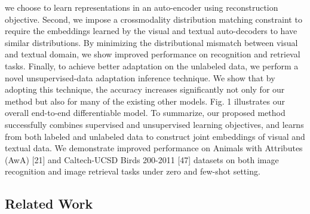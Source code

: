 \documentclass[10pt,twocolumn,letterpaper]{article}
\begin{document}
we choose to learn representations in an auto-encoder using reconstruction objective. Second, we impose a crossmodality distribution matching constraint to require the embeddings learned by the visual and textual auto-decoders to
have similar distributions. By minimizing the distributional
mismatch between visual and textual domain, we show improved performance on recognition and retrieval tasks. Finally, to achieve better adaptation on the unlabeled data,
we perform a novel unsupervised-data adaptation inference
technique. We show that by adopting this technique, the accuracy increases significantly not only for our method but
also for many of the existing other models. Fig. 1 illustrates our overall end-to-end differentiable model.
To summarize, our proposed method successfully combines supervised and unsupervised learning objectives,
and learns from both labeled and unlabeled data to construct joint embeddings of visual and textual data. We
demonstrate improved performance on Animals with Attributes (AwA) [21] and Caltech-UCSD Birds 200-2011
[47] datasets on both image recognition and image retrieval
tasks under zero and few-shot setting.
\subsection{Related Work}
\end{document}
